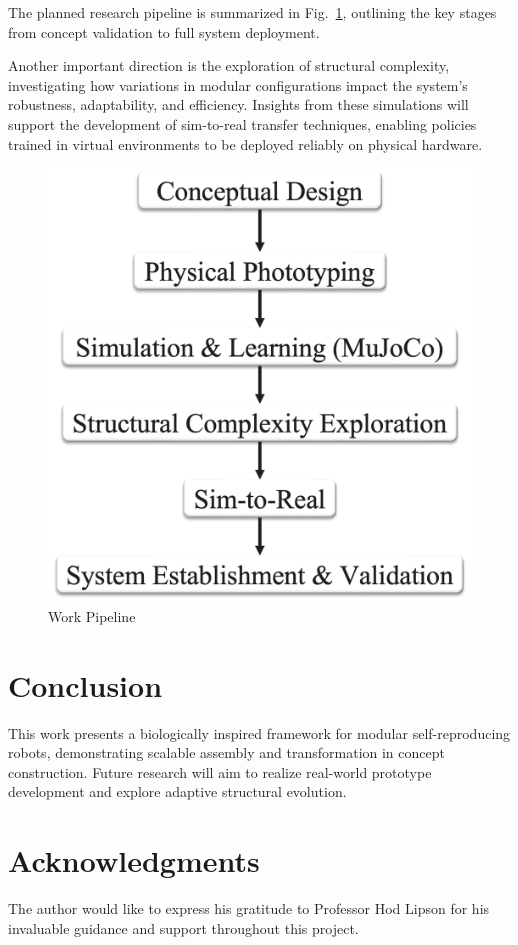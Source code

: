 \documentclass[lettersize,journal]{IEEEtran}
\begin{document}
 The planned research pipeline is summarized in Fig.~\ref{fig:pipeline}, outlining the key stages from concept validation to full system deployment.

Another important direction is the exploration of structural complexity, investigating how variations in modular configurations impact the system’s robustness, adaptability, and efficiency. Insights from these simulations will support the development of sim-to-real transfer techniques, enabling policies trained in virtual environments to be deployed reliably on physical hardware.

\begin{figure}[H]
    \centering
    \includegraphics[width=0.65\linewidth]{pipeline.png}
    \caption{Work Pipeline}
    \label{fig:pipeline}
\end{figure}

\section{Conclusion}
This work presents a biologically inspired framework for modular self-reproducing robots, demonstrating scalable assembly and transformation in concept construction. Future research will aim to realize real-world prototype development and explore adaptive structural evolution.


\section*{Acknowledgments}
The author would like to express his gratitude to Professor Hod Lipson for his invaluable guidance and support throughout this project. 

  
  
\end{document}
